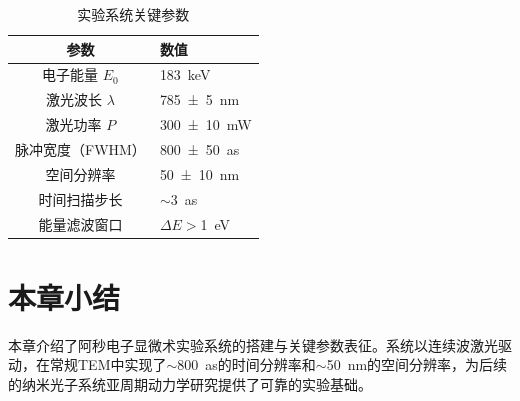 
\begin{table}[htbp]
    \caption{\label{tab:ch3-params} 实验系统关键参数}
    \begin{tabularx}{\linewidth}{c|X<{\centering}}
        \hline
        参数 & 数值 \\ \hline
        电子能量 $E_0$ & \SI{183}{keV} \\ \hline
        激光波长 $\lambda$ & \SI{785(5)}{nm} \\ \hline
        激光功率 $P$ & \SI{300(10)}{mW} \\ \hline
        脉冲宽度（FWHM）& \SI{800(50)}{as} \\ \hline
        空间分辨率 & \SI{50(10)}{nm} \\ \hline
        时间扫描步长 & $\sim$\SI{3}{as} \\ \hline
        能量滤波窗口 & $\Delta E > $\SI{1}{eV} \\ \hline
    \end{tabularx}
\end{table}

\section{本章小结}
\label{sec:method-summary}

本章介绍了阿秒电子显微术实验系统的搭建与关键参数表征。系统以连续波激光驱动，在常规TEM中实现了$\sim$\SI{800}{as}的时间分辨率和$\sim$\SI{50}{nm}的空间分辨率，为后续的纳米光子系统亚周期动力学研究提供了可靠的实验基础。
